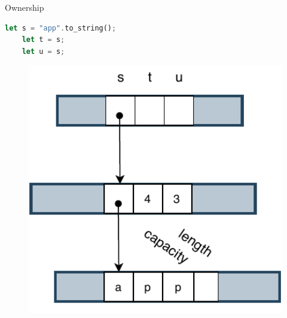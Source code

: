 \documentclass[9pt]{beamer}
\begin{document}
\begin{frame}[t, fragile]{Ownership}
    \vspace{-0.5cm}
    \begin{minipage}{0.7\linewidth}
    \begin{lstlisting}[language=Rust]
    let s = "app".to_string();
    let t = s;
    let u = s;
    \end{lstlisting}
    \end{minipage}     
    
        \begin{minipage}{0.3\linewidth}
            \begin{figure}[hp]
                \centering
                \begin{center}
                        \includegraphics[width=1.0\textwidth]{images/owner1.pdf}
                        \captionsetup{labelformat=empty}
                \end{center}
                

\end{figure}
\end{minipage}
\end{frame}
\end{document}
